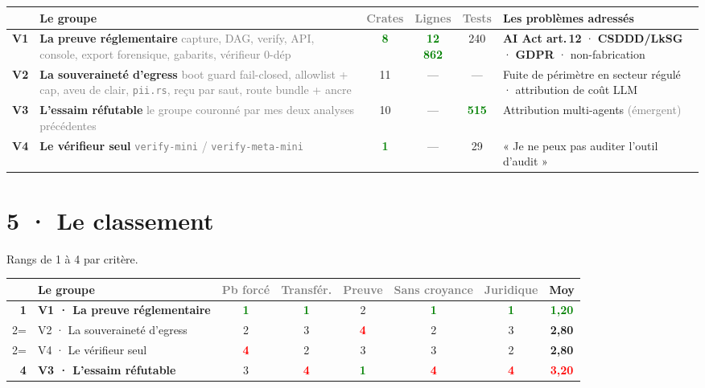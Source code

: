 \documentclass[10pt]{article}
\newcommand{\best}[1]{\textcolor{green}{\textbf{#1}}}
\newcommand{\pire}[1]{\textcolor{red}{\textbf{#1}}}
\newcommand{\sz}[1]{\textcolor{grey}{\small\textsf{#1}}}
\newcommand{\code}[1]{\texttt{\small #1}}
\begin{document}
\renewcommand{\arraystretch}{1.24}
\begin{center}\small
\begin{tabular}{@{}c >{\raggedright\arraybackslash}p{5.35cm} c c c >{\raggedright\arraybackslash}p{5.0cm}@{}}
\toprule
& \textbf{Le groupe} & \sz{Crates} & \sz{Lignes} & \sz{Tests} & \textbf{Les problèmes adressés} \\
\midrule
\textbf{V1} & \textbf{La preuve réglementaire} \sz{capture, DAG, verify, API, console, export forensique, gabarits, vérifieur 0-dép} & \best{8} & \best{12 862} & 240 & \textbf{AI Act art.\,12} · \textbf{CSDDD/LkSG} · \textbf{GDPR} · non-fabrication \\
\textbf{V2} & \textbf{La souveraineté d'egress} \sz{boot guard fail-closed, allowlist + cap, aveu de clair, \code{pii.rs}, reçu par saut, route bundle + ancre} & 11 & --- & --- & Fuite de périmètre en secteur régulé · attribution de coût LLM \\
\textbf{V3} & \textbf{L'essaim réfutable} \sz{le groupe couronné par mes deux analyses précédentes} & 10 & --- & \best{515} & Attribution multi-agents \sz{(émergent)} \\
\textbf{V4} & \textbf{Le vérifieur seul} \sz{\code{verify-mini} / \code{verify-meta-mini}} & \best{1} & --- & 29 & « Je ne peux pas auditer l'outil d'audit » \\
\bottomrule
\end{tabular}
\end{center}

\section{5 · Le classement}

Rangs de 1 à 4 par critère.

\renewcommand{\arraystretch}{1.2}
\begin{center}\small
\begin{tabular}{@{}r >{\raggedright\arraybackslash}p{6.0cm} ccccc c@{}}
\toprule
& \textbf{Le groupe} & \sz{Pb forcé} & \sz{Transfér.} & \sz{Preuve} & \sz{Sans croyance} & \sz{Juridique} & \textbf{Moy} \\
\midrule
\textbf{1} & \textbf{V1 · La preuve réglementaire} & \best{1} & \best{1} & 2 & \best{1} & \best{1} & \best{1,20} \\
2= & V2 · La souveraineté d'egress & 2 & 3 & \pire{4} & 2 & 3 & \textbf{2,80} \\
2= & V4 · Le vérifieur seul & \pire{4} & 2 & 3 & 3 & 2 & \textbf{2,80} \\
\textbf{4} & \textbf{V3 · L'essaim réfutable} & 3 & \pire{4} & \best{1} & \pire{4} & \pire{4} & \pire{3,20} \\
\bottomrule
\end{tabular}
\end{center}
\end{document}
